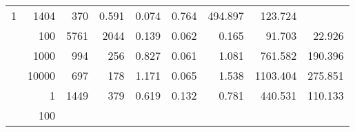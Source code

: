 \begin{table}
\begin{tabular}{rrrrrrrrr}
					
					 
					\multirow{ 1 }{*}{ 1 } &
					
						
							    
							     1404  & 370  
	                           & 0.591 & 0.074 & 0.764
	                           & 494.897 & 123.724  \\
	                
	            
					 &  
					 
					\multirow{ 1 }{*}{ 100 } &
					
						
							    
							     5761  & 2044  
	                           & 0.139 & 0.062 & 0.165
	                           & 91.703 & 22.926  \\
	                
	            
					 &  
					 
					\multirow{ 1 }{*}{ 1000 } &
					
						
							    
							     994  & 256  
	                           & 0.827 & 0.061 & 1.081
	                           & 761.582 & 190.396  \\
	                
	            
					 &  
					 
					\multirow{ 1 }{*}{ 10000 } &
					
						
							    
							     697  & 178  
	                           & 1.171 & 0.065 & 1.538
	                           & 1103.404 & 275.851  \\
	                
	            
	        
				\noalign{\smallskip}\hline
				\multirow{ 4 }{*}{ 2000000 } &
				
					
					 
					\multirow{ 1 }{*}{ 1 } &
					
						
							    
							     1449  & 379  
	                           & 0.619 & 0.132 & 0.781
	                           & 440.531 & 110.133  \\
	                
	            
					 &  
					 
					\multirow{ 1 }{*}{ 100 } &
					
						
							    

\end{tabular}
\end{table}
